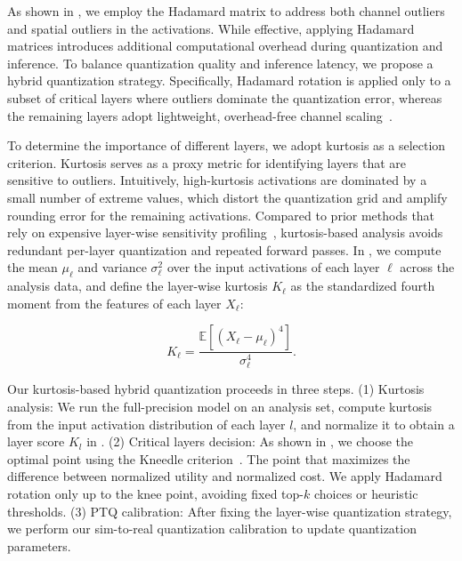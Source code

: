 As shown in , we employ the Hadamard matrix to address both channel outliers and spatial outliers in the activations.
While effective, applying Hadamard matrices introduces additional computational overhead during quantization and inference. 
To balance quantization quality and inference latency, we propose a hybrid quantization strategy. 
Specifically, Hadamard rotation is applied only to a subset of critical layers where outliers dominate the quantization error, 
whereas the remaining layers adopt lightweight, overhead-free channel scaling~\cite{xiao2022smoothquant}.

To determine the importance of different layers, we adopt kurtosis as a selection criterion.
Kurtosis serves as a proxy metric for identifying layers that are sensitive to outliers.
Intuitively, high-kurtosis activations are dominated by a small number of extreme values, which distort the quantization grid and amplify rounding error for the remaining activations.
Compared to prior methods that rely on expensive layer-wise sensitivity profiling~\cite{zhao2024mixdq}, kurtosis-based analysis avoids redundant per-layer quantization and repeated forward passes.
In , we compute the mean $\mu_\ell$ and variance $\sigma_\ell^2$ over the input activations of each layer $\ell$ across the analysis data, and define the layer-wise kurtosis $K_\ell$ as the standardized fourth moment from the features of each layer $X_\ell$:

\begin{equation}
  K_\ell = \frac{\mathbb{E}[(X_\ell - \mu_\ell)^4]}{\sigma_\ell^4}.
  \label{eq:kurtosis}
\end{equation}

Our kurtosis-based hybrid quantization proceeds in three steps.
(1) Kurtosis analysis: We run the full-precision model on an analysis set, compute kurtosis from the input activation distribution of each layer $l$, and normalize it to obtain a layer score $K_l$ in
.
(2) Critical layers decision: 
As shown in , we choose the optimal point using the Kneedle criterion~\cite{satopaa2011kneedle}. 
The point that maximizes the difference between normalized utility and normalized cost.
We apply Hadamard rotation only up to the knee point, avoiding fixed top-$k$ choices or heuristic thresholds.
(3) PTQ calibration: After fixing the layer-wise quantization strategy, we perform our sim-to-real quantization calibration to update quantization parameters.

